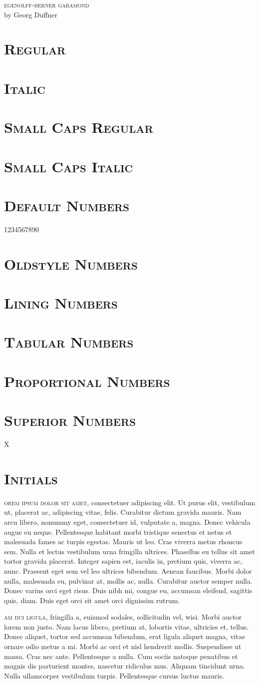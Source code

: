 \documentclass{article}
\newcommand{\Section}[1]{\section*{\scshape\lsstyle#1}}
\begin{document}
\begin{center}\huge
\textsc{\lsstyle egenolff-berner garamond}\\[0.5ex]
\swshape\Large
by Georg Duffner
\end{center}


\Section{Regular}
\lipsum[1]

\Section{Italic}
\textit{\lipsum[2]}


\Section{Small Caps Regular}
\textsc{\lipsum[5]}

\Section{Small Caps Italic}
\textsc{\textit{\lipsum[6]}}

\Section{Default Numbers}

1234567890

\Section{Oldstyle Numbers}


\Section{Lining Numbers}


\Section{Tabular Numbers}


\Section{Proportional Numbers}


\Section{Superior Numbers}

X


\clearpage
\Section{Initials}\Large

\sloppy
\lettrine[lraise=0.15,nindent=0.1em]{}{orem ipsum dolor sit amet}, consectetuer adipiscing elit. Ut purus elit, vestibulum
ut, placerat ac, adipiscing vitae, felis. Curabitur dictum gravida mauris. Nam arcu
libero, nonummy eget, consectetuer id, vulputate a, magna. Donec vehicula augue eu
neque. Pellentesque habitant morbi tristique senectus et netus et malesuada fames
ac turpis egestas. Mauris ut leo. Cras viverra metus rhoncus sem. Nulla et lectus
vestibulum urna fringilla ultrices. Phasellus eu tellus sit amet tortor gravida placerat.
Integer sapien est, iaculis in, pretium quis, viverra ac, nunc. Praesent eget sem vel
leo ultrices bibendum. Aenean faucibus. Morbi dolor nulla, malesuada eu, pulvinar
at, mollis ac, nulla. Curabitur auctor semper nulla. Donec varius orci eget risus. Duis
nibh mi, congue eu, accumsan eleifend, sagittis quis, diam. Duis eget orci sit amet orci
dignissim rutrum.

\lettrine[lraise=0.15,nindent=0.1em]{}{am dui ligula}, fringilla a, euismod sodales, sollicitudin vel, wisi. Morbi auctor lorem
non justo. Nam lacus libero, pretium at, lobortis vitae, ultricies et, tellus. Donec aliquet,
tortor sed accumsan bibendum, erat ligula aliquet magna, vitae ornare odio metus a mi.
Morbi ac orci et nisl hendrerit mollis. Suspendisse ut massa. Cras nec ante. Pellentesque a
nulla. Cum sociis natoque penatibus et magnis dis parturient montes, nascetur ridiculus
mus. Aliquam tincidunt urna. Nulla ullamcorper vestibulum turpis. Pellentesque cursus
luctus mauris.
\end{document}
